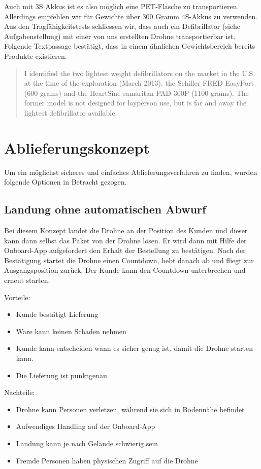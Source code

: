 Auch mit 3S Akkus ist es also möglich eine PET-Flasche zu transportieren. Allerdings empfehlen wir für Gewichte über 300 Gramm 4S-Akkus zu verwenden.\\

Aus den Tragfähigkeitstests schliessen wir, dass auch ein Defibrillator (siehe Aufgabenstellung) mit einer von uns erstellten Drohne transportierbar ist. Folgende Textpassage \cite[p.3]{FleckUAV} bestätigt, dass in einem ähnlichen Gewichtsbereich bereits Produkte existieren.

\blockquote{I identified the two lightest weight defibrillators on the market in the U.S. at the time of the exploration (March 2013): the Schiller FRED EasyPort (600 grams) and the HeartSine samaritan PAD 300P (1100 grams). The former model is not designed for layperson use, but is far and away the lightest defibrillator available.} 

\section{Ablieferungskonzept}

Um ein möglichst sicheres und einfaches Ablieferungsverfahren zu finden, wurden folgende Optionen in Betracht gezogen.

\subsection{Landung ohne automatischen Abwurf}

Bei diesem Konzept landet die Drohne an der Position des Kunden und dieser kann dann selbst das Paket von der Drohne lösen. Er wird dann mit Hilfe der Onboard-App aufgefordert den Erhalt der Bestellung zu bestätigen. Nach der Bestätigung startet die Drohne einen Countdown, hebt danach ab und fliegt zur Ausgangsposition zurück. Der Kunde kann den Countdown unterbrechen und erneut starten.

Vorteile:
\begin{itemize}
	\item Kunde bestätigt Lieferung
	\item Ware kann keinen Schaden nehmen
	\item Kunde kann entscheiden wann es sicher genug ist, damit die Drohne starten kann.
	\item Die Lieferung ist punktgenau 
\end{itemize}


Nachteile:
\begin{itemize}
	\item Drohne kann Personen verletzen, während sie sich in Bodennähe befindet
	\item Aufwendiges Handling auf der Onboard-App
	\item Landung kann je nach Gelände schwierig sein 
	\item Fremde Personen haben physischen Zugriff auf die Drohne
\end{itemize}

